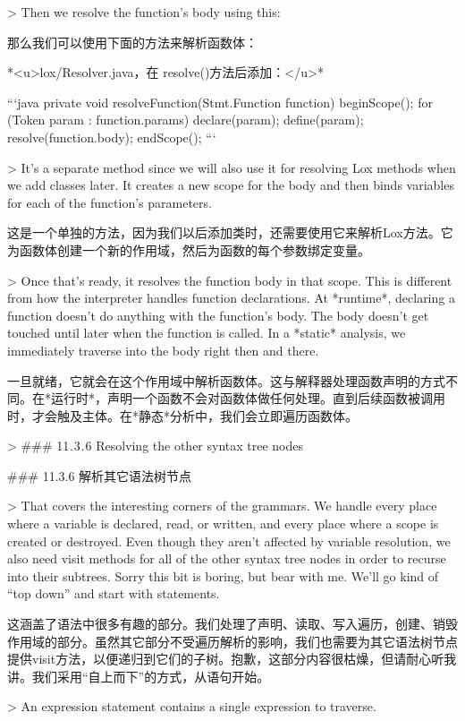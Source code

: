 \documentclass[cn,11pt,chinese]{elegantbook}
\begin{document}
{{{{{{{{{{{{{> Then we resolve the function’s body using this:

那么我们可以使用下面的方法来解析函数体：

*<u>lox/Resolver.java，在 resolve()方法后添加：</u>*

```java
  private void resolveFunction(Stmt.Function function) {
    beginScope();
    for (Token param : function.params) {
      declare(param);
      define(param);
    }
    resolve(function.body);
    endScope();
  }
```

> It’s a separate method since we will also use it for resolving Lox methods when we add classes later. It creates a new scope for the body and then binds variables for each of the function’s parameters.

这是一个单独的方法，因为我们以后添加类时，还需要使用它来解析Lox方法。它为函数体创建一个新的作用域，然后为函数的每个参数绑定变量。

> Once that’s ready, it resolves the function body in that scope. This is different from how the interpreter handles function declarations. At *runtime*, declaring a function doesn’t do anything with the function’s body. The body doesn’t get touched until later when the function is called. In a *static* analysis, we immediately traverse into the body right then and there.

一旦就绪，它就会在这个作用域中解析函数体。这与解释器处理函数声明的方式不同。在*运行时*，声明一个函数不会对函数体做任何处理。直到后续函数被调用时，才会触及主体。在*静态*分析中，我们会立即遍历函数体。

> ### 11 . 3 . 6 Resolving the other syntax tree nodes

### 11.3.6 解析其它语法树节点

> That covers the interesting corners of the grammars. We handle every place where a variable is declared, read, or written, and every place where a scope is created or destroyed. Even though they aren’t affected by variable resolution, we also need visit methods for all of the other syntax tree nodes in order to recurse into their subtrees. Sorry this bit is boring, but bear with me. We’ll go kind of “top down” and start with statements.

这涵盖了语法中很多有趣的部分。我们处理了声明、读取、写入遍历，创建、销毁作用域的部分。虽然其它部分不受遍历解析的影响，我们也需要为其它语法树节点提供visit方法，以便递归到它们的子树。抱歉，这部分内容很枯燥，但请耐心听我讲。我们采用“自上而下”的方式，从语句开始。

> An expression statement contains a single expression to traverse.

}}}}}}}}}}}}}
\end{document}
